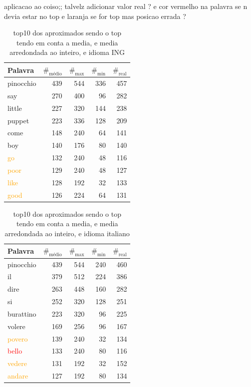 \documentclass[mirror, portugues]{revdetua}
\begin{document}
aplicacao ao coiso;; talvelz adicionar valor real ? e cor vermelho na palavra se n devia estar no top e laranja se for top mas posicao errada ?

\begin{table}[H]
\centering
\caption{top10 dos aproximados sendo o top tendo em conta a media, e media arredondada ao inteiro, e idioma ING}
\label{table:top10_aprox_ingles}
\begin{tabular}{lrrr|r}
\toprule
Palavra & $\text{\#}_{\text{médio}}$ & $\text{\#}_{\text{max}}$ & $\text{\#}_{\text{min}}$ & $\text{\#}_{\text{real}}$ \\
\midrule
pinocchio & 439 & 544 & 336 & 457 \\
say & 270 & 400 & 96 & 282 \\
little & 227 & 320 & 144 & 238 \\
puppet & 223 & 336 & 128 & 209 \\
come & 148 & 240 & 64 & 141 \\
boy & 140 & 176 & 80 & 140 \\
\textcolor{orange}{go} & 132 & 240 & 48 & 116 \\
\textcolor{orange}{poor} & 129 & 240 & 48 & 127 \\
\textcolor{orange}{like} & 128 & 192 & 32 & 133 \\
\textcolor{orange}{good} & 126 & 224 & 64 & 131 \\
\bottomrule
\end{tabular}
\end{table}

\begin{table}[H]
\centering
\caption{top10 dos aproximados sendo o top tendo em conta a media, e media arredondada ao inteiro, e idioma italiano}
\label{table:top10_aprox_italiano}
\begin{tabular}{lrrr|r}
\toprule
Palavra & $\text{\#}_{\text{médio}}$ & $\text{\#}_{\text{max}}$ & $\text{\#}_{\text{min}}$ & $\text{\#}_{\text{real}}$ \\
\midrule
pinocchio & 439 & 544 & 240 & 460 \\
il & 379 & 512 & 224 & 386 \\
dire & 263 & 448 & 160 & 282 \\
si & 252 & 320 & 128 & 251 \\
burattino & 223 & 320 & 96 & 225 \\
volere & 169 & 256 & 96 & 167 \\
\textcolor{orange}{povero} & 139 & 240 & 32 & 134 \\
\textcolor{red}{bello} & 133 & 240 & 80 & 116 \\
\textcolor{orange}{vedere} & 131 & 192 & 32 & 152 \\
\textcolor{orange}{andare} & 127 & 192 & 80 & 134 \\
\bottomrule
\end{tabular}
\end{table}
\end{document}
